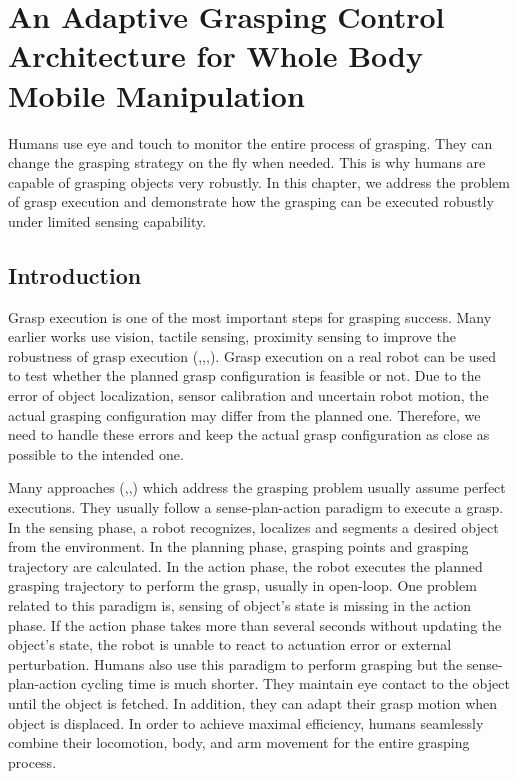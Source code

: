 \chapter{An Adaptive Grasping Control Architecture for Whole Body Mobile Manipulation} \label{chapter_control}
Humans use eye and touch to monitor the entire process of grasping. They can change the grasping strategy on the fly when needed. This is why humans are capable of grasping objects very robustly. 
In this chapter, we address the problem of grasp execution and demonstrate how the grasping can be executed robustly under limited sensing capability.  

\section{Introduction}
Grasp execution is one of the most important steps for grasping success. Many earlier works use vision, tactile sensing, proximity sensing to improve the robustness of grasp execution (\cite{Felip2009},\cite{Hsiao2010},\cite{Hudson2012},\cite{jiang2012seashell}). Grasp execution on a real robot can be used to test whether the planned grasp configuration is feasible or not. Due to the error of object localization, sensor calibration and uncertain robot motion, the actual grasping configuration may differ from the planned one. Therefore, we need to handle these errors and keep the actual grasp configuration as close as possible to the intended one. 

Many approaches (\cite{Kamon1996},\cite{Rao2010},\cite{Roa2009}) which address the grasping problem usually assume perfect executions. They usually follow a sense-plan-action paradigm to execute a grasp. In the sensing phase, a robot recognizes, localizes and segments a desired object from the environment. In the planning phase, grasping points and grasping trajectory are calculated. In the action phase, the robot executes the  planned grasping trajectory to perform the grasp, usually in open-loop. One problem related to this paradigm is, sensing of object's state is missing in the action phase. If the action phase takes more than several seconds  without updating the object's state, the robot is unable to react to actuation error or external perturbation. Humans also use this paradigm to perform grasping but the sense-plan-action cycling time is much shorter. They maintain eye contact to the object until the object is fetched. In addition, they can adapt their grasp motion when object is displaced. In order to achieve maximal efficiency, humans seamlessly combine their locomotion, body, and arm movement for the entire grasping process.

